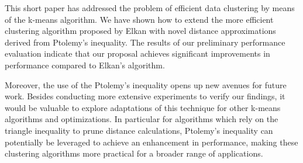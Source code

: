 
This short paper has addressed the problem of efficient data clustering by means of the k-means algorithm.
We have shown how to extend the more efficient clustering algorithm proposed by Elkan with novel distance approximations derived from Ptolemy's inequality.
The results of our preliminary performance evaluation indicate that our proposal achieves significant improvements in performance compared to Elkan's algorithm. %

Moreover, the use of the Ptolemy's inequality opens up new avenues for future work.
Besides conducting more extensive experiments to verify our findings,
it would be valuable to explore adaptations of this technique for other k-means algorithms and optimizations.
In particular for algorithms which rely on the triangle inequality to prune distance calculations, Ptolemy's inequality can potentially be leveraged to achieve an enhancement in performance, making these clustering algorithms more practical for a broader range of applications.




